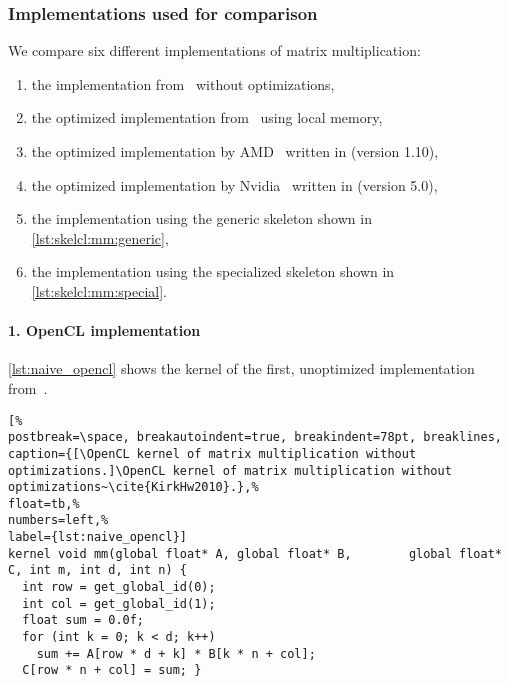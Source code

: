 \subsubsection*{Implementations used for comparison}
We compare six different implementations of matrix multiplication:
\begin{enumerate}
  \item the \OpenCL implementation from~\cite{KirkHw2010} without optimizations,
  \item the optimized \OpenCL implementation from~\cite{KirkHw2010} using \GPU local memory,
  \item the optimized \BLAS implementation by AMD~\cite{APPML} written in \OpenCL (\clBLAS version 1.10),
  \item the optimized \BLAS implementation by Nvidia~\cite{cuBLAS} written in \CUDA (\CUBLAS version 5.0),
  \item the \SkelCL implementation using the generic \allpairs skeleton shown in \autoref{lst:skelcl:mm:generic},
  \item the \SkelCL implementation using the specialized \allpairs skeleton shown in \autoref{lst:skelcl:mm:special}.
\end{enumerate}

\paragraph{1. OpenCL implementation}
\autoref{lst:naive_opencl} shows the kernel of the first, unoptimized \OpenCL implementation from~\cite{KirkHw2010}.
\begin{lstlisting}[%                                                             
postbreak=\space, breakautoindent=true, breakindent=78pt, breaklines,
caption={[\OpenCL kernel of matrix multiplication without optimizations.]\OpenCL kernel of matrix multiplication without optimizations~\cite{KirkHw2010}.},%
float=tb,%
numbers=left,%
label={lst:naive_opencl}]
kernel void mm(global float* A, global float* B,        global float* C, int m, int d, int n) {
  int row = get_global_id(0);
  int col = get_global_id(1);
  float sum = 0.0f;
  for (int k = 0; k < d; k++)
    sum += A[row * d + k] * B[k * n + col];
  C[row * n + col] = sum; }
\end{lstlisting}

\vspace{-.5em}

